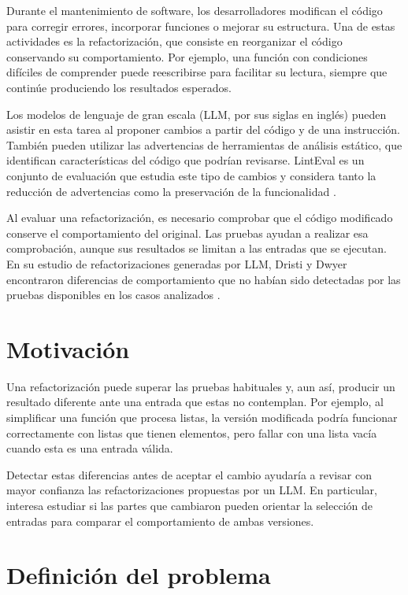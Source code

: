 \documentclass[11pt,openright,final]{unsa}
\begin{document}
Durante el mantenimiento de software, los desarrolladores modifican el código para corregir errores, incorporar funciones o mejorar su estructura. Una de estas actividades es la refactorización, que consiste en reorganizar el código conservando su comportamiento. Por ejemplo, una función con condiciones difíciles de comprender puede reescribirse para facilitar su lectura, siempre que continúe produciendo los resultados esperados.

Los modelos de lenguaje de gran escala (LLM, por sus siglas en inglés) pueden asistir en esta tarea al proponer cambios a partir del código y de una instrucción. También pueden utilizar las advertencias de herramientas de análisis estático, que identifican características del código que podrían revisarse. LintEval es un conjunto de evaluación que estudia este tipo de cambios y considera tanto la reducción de advertencias como la preservación de la funcionalidad \cite{ref1}.

Al evaluar una refactorización, es necesario comprobar que el código modificado conserve el comportamiento del original. Las pruebas ayudan a realizar esa comprobación, aunque sus resultados se limitan a las entradas que se ejecutan. En su estudio de refactorizaciones generadas por LLM, Dristi y Dwyer encontraron diferencias de comportamiento que no habían sido detectadas por las pruebas disponibles en los casos analizados \cite{ref2}.

\section{Motivación}

Una refactorización puede superar las pruebas habituales y, aun así, producir un resultado diferente ante una entrada que estas no contemplan. Por ejemplo, al simplificar una función que procesa listas, la versión modificada podría funcionar correctamente con listas que tienen elementos, pero fallar con una lista vacía cuando esta es una entrada válida.

Detectar estas diferencias antes de aceptar el cambio ayudaría a revisar con mayor confianza las refactorizaciones propuestas por un LLM. En particular, interesa estudiar si las partes que cambiaron pueden orientar la selección de entradas para comparar el comportamiento de ambas versiones.

\section{Definición del problema}
\end{document}
